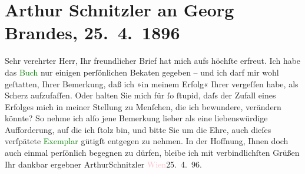 

               \section[Arthur Schnitzler an Georg Brandes, 25. 4. 1896]{ Arthur Schnitzler an Georg Brandes, 25. 4. 1896}\nopagebreak{}\rehead{ }\normalsize\beginnumbering{} \toendnotes[C]{\smallbreak\pagebreak[2]} 
\toendnotes[C]{\smallbreak}\pstart\center{}{\pb}Sehr verehrter Herr,\pend\pstart
           Ihr freundlicher Brief hat mich aufs höchſte erfreut. Ich habe das \textcolor{green}{Buch}{} nur einigen perſönlichen Beka{\geminationn}ten gegeben – und ich darf mir wohl geſtatten,
                    Ihrer Bemerkung, daß ich »in meinem Erfolg« Ihrer vergeſſen habe, als Scherz
                    aufzufaſſen. {\pb}Oder halten Sie mich für ſo
                    ſtupid, daſs der Zufall eines Erfolges mich in meiner Stellung zu Menſchen, die
                    ich bewundere, verändern könnte? So nehme ich alſo jene Bemerkung lieber als
                    eine liebenswürdige Aufforderung, auf die ich ſtolz bin, und bitte Sie um die
                    Ehre, auch dieſes verſpätete \textcolor{green}{Exemplar}{}
                    gütigſt entgegen zu nehmen.\pend
           \pstart {\pb}In der Hoffnung, Ihnen doch auch einmal
                    perſönlich begegnen zu dürfen, bleibe ich mit verbindlichſten Grüßen Ihr dankbar
                    ergebner \spacefill\mbox{ArthurSchnitzler}\pend{}\pstart
           \textcolor{pink}{Wien}{}\ledrightnote{\textcolor{pink}{Wien}}{ }25. 4. 96.\pend
           \endnumbering{}  
      